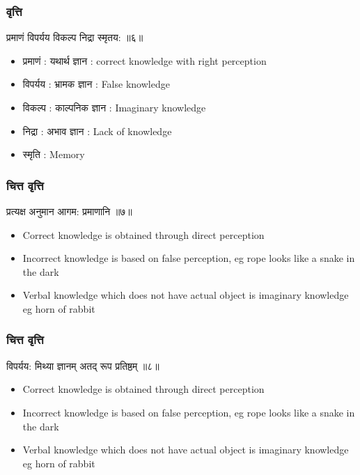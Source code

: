 \begin{frame}[fragile]\frametitle{वृत्ति}

\begin{sanskrit}
 प्रमाणं विपर्यय विकल्प निद्रा स्मृतय: ॥६॥
\end{sanskrit}


\begin{itemize}
\item प्रमाणं : यथार्थ ज्ञान : correct knowledge with right perception
\item विपर्यय : भ्रामक ज्ञान : False knowledge
\item विकल्प : काल्पनिक ज्ञान : Imaginary knowledge
\item निद्रा : अभाव ज्ञान : Lack of knowledge
\item स्मृति : Memory
\end{itemize}	

\end{frame}



\begin{frame}[fragile]\frametitle{चित्त वृत्ति}

\begin{sanskrit}
प्रत्यक्ष अनुमान आगम: प्रमाणानि ॥७॥
\end{sanskrit}


	\begin{itemize}
	\item Correct knowledge is obtained through direct perception
	\item Incorrect knowledge is based on false perception, eg rope looks like a snake in the dark
	\item Verbal knowledge which does not have actual object is imaginary knowledge eg horn of rabbit
	\end{itemize}

\end{frame}


\begin{frame}[fragile]\frametitle{चित्त वृत्ति}

\begin{sanskrit}
विपर्यय: मिथ्या ज्ञानम् अतद् रूप प्रतिष्ठम् ॥८॥
\end{sanskrit}


	\begin{itemize}
	\item Correct knowledge is obtained through direct perception
	\item Incorrect knowledge is based on false perception, eg rope looks like a snake in the dark
	\item Verbal knowledge which does not have actual object is imaginary knowledge eg horn of rabbit
	\end{itemize}

\end{frame}

